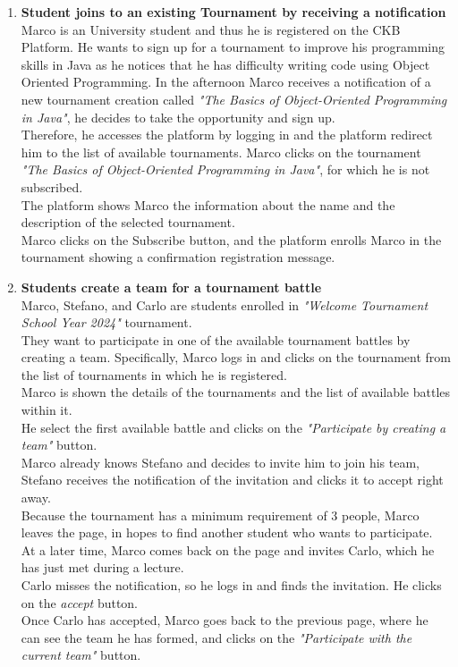 \begin{enumerate}
	\item \textbf{Student joins to an existing Tournament by receiving a notification}\\
	      Marco is an University student and thus he is registered on the CKB Platform.
	      He wants to sign up for a tournament to improve his programming skills in Java as he notices that he has difficulty writing code using Object Oriented Programming.
	      In the afternoon Marco receives a notification of a new tournament creation called \emph{"The Basics of Object-Oriented Programming in Java"}, he decides to take the opportunity and sign up.\\
	      Therefore, he accesses the platform by logging in and the platform redirect him to the list of available tournaments. Marco clicks on the tournament \emph{"The Basics of Object-Oriented Programming in Java"}, for which he is not subscribed.\\
	      The platform shows Marco the information about the name and the description of the selected tournament. \\
	      Marco clicks on the Subscribe button, and the platform enrolls Marco in the tournament showing a confirmation registration message.

	\item \textbf{Students create a team for a tournament battle}\\
	      Marco, Stefano, and Carlo are students enrolled in \emph{"Welcome Tournament School Year 2024"} tournament.\\
	      They want to participate in one of the available tournament battles by creating a team.
	      Specifically, Marco logs in and clicks on the tournament from the list of tournaments in which he is registered.\\
	      Marco is shown the details of the tournaments and the list of available battles within it.\\
	      He select the first available battle and clicks on the \emph{"Participate by creating a team"} button.\\
	      Marco already knows Stefano and decides to invite him to join his team, Stefano receives the notification of the invitation and
	      clicks it to accept right away.\\
	      Because the tournament has a minimum requirement of 3 people, Marco leaves the page, in hopes to find another student who wants to participate.\\
	      At a later time, Marco comes back on the page and invites Carlo, which he has just met during a lecture.\\
	      Carlo misses the notification, so he logs in and finds the invitation. He clicks on the \emph{accept} button.\\
	      Once Carlo has accepted, Marco goes back to the previous page, where he can see the team he has formed,
	      and clicks on the \emph{"Participate with the current team"} button.


\end{enumerate}
